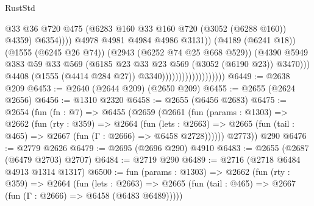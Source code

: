 \begin{lexlean}{RustStd}
\begin{coremodule}
                                                        @33
                                                        @36
                                                        @720
                                                        @475
                                                        (@6283
                                                          @160
                                                          @33
                                                          @160
                                                          @720
                                                          (@3052 (@6288 @160))
                                                          @4359)
                                                        @6354))))
                                                @4978
                                                @4981
                                                @4984
                                                @4986
                                                @3131))
                                            (@4189 (@6241 @18))
                                            (@1555 (@6245 @26 @74))
                                            (@2943 (@6252 @74 @25 @668 @529))
                                            (@4390
                                              @5949
                                              @383
                                              @59
                                              @33
                                              @569
                                              (@6185 @23 @33 @23 @569 (@3052 (@6190 @23)) @3470)))
                                          @4408
                                          (@1555 (@4414 @284 @27))
                                          @3340)))))))))))))))))))
@6449 := @2638 @209
@6453 := @2640 (@2644 @209) (@2650 @209)
@6455 := @2655 (@2624 @2656)
@6456 := @1310 @2320
@6458 := @2655 (@6456 @2683)
@6475 := @2654
    (fun (fn : @7) =>
    @6455
      (@2659
        (@2661
          (fun (params : @1303) =>
          @2662
            (fun (rty : @359) =>
            @2664
              (fun (lets : @2663) =>
              @2665 (fun (tail : @465) => @2667 (fun (Γ : @2666) => @6458 @2728))))))
        @2773))
    @290
@6476 := @2779 @2626
@6479 := @2695 (@2696 @290) @4910
@6483 := @2655 (@2687 (@6479 @2703) @2707)
@6484 := @2719 @290
@6489 := @2716 (@2718 @6484 @4913 @1314 @1317)
@6500 := fun (params : @1303) =>
  @2662
    (fun (rty : @359) =>
    @2664
      (fun (lets : @2663) =>
      @2665 (fun (tail : @465) => @2667 (fun (Γ : @2666) => @6458 (@6483 @6489)))))

\end{coremodule}
\end{lexlean}
